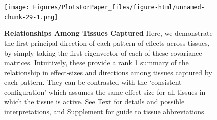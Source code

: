 \begin{figure}[htbp]
\texttt{[image: Figures/PlotsForPaper\_files/figure-html/unnamed-chunk-29-1.png]}
\caption{\textbf{Relationships Among Tissues Captured} Here, we demonstrate the first principal direction of each pattern of effects across tissues, by simply taking the first eigenvector of each of these covariance matrices. Intuitively, these provide a rank 1 summary of the relationship in effect-sizes and directions among tissues captured by each pattern. They can be contrasted with the `consistent configuration' which assumes the same effect-size for all tissues in which the tissue is active. See Text for details and possible interpretations, and Supplement for guide to tissue abbreviations.}
\label{fig:pcplot}
\end{figure}\newline

%


